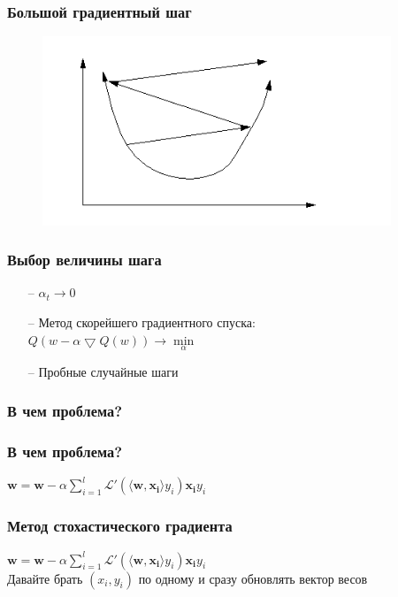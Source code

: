 \documentclass[12pt]{beamer}
\begin{document}
\begin{frame}\frametitle{Большой градиентный шаг}
\begin{figure}[htbp]
  \includegraphics[height=160pt, keepaspectratio = true]{images/learning_rate_large}
\end{figure}
\end{frame}

\begin{frame}\frametitle{Выбор величины шага}
\begin{itemize}
\item[--] $\alpha_t \rightarrow 0$\\
\item[--] Метод скорейшего градиентного спуска:\\
$Q(w - \alpha \bigtriangledown Q(w)) \rightarrow \min\limits_{\alpha}$
\item[--] Пробные случайные шаги
\end{itemize}
\end{frame}

\begin{frame}\frametitle{В чем проблема?}

\end{frame}

\begin{frame}\frametitle{В чем проблема?}
$\mathbf{w} =  \mathbf{w} - \alpha \sum\limits_{i=1}^l \mathcal{L}'(\langle \mathbf{w}, \mathbf{x_i} \rangle y_i)\mathbf{x_i}y_i$\\
\vspace{5mm}
\end{frame}

\begin{frame}\frametitle{Метод стохастического градиента}
$\mathbf{w} =  \mathbf{w} - \alpha \sum\limits_{i=1}^l \mathcal{L}'(\langle \mathbf{w}, \mathbf{x_i}\rangle y_i)\mathbf{x_i}y_i$\\
\vspace{5mm}
Давайте брать $(x_i, y_i)$ по одному и сразу обновлять вектор весов
\end{frame}
\end{document}
